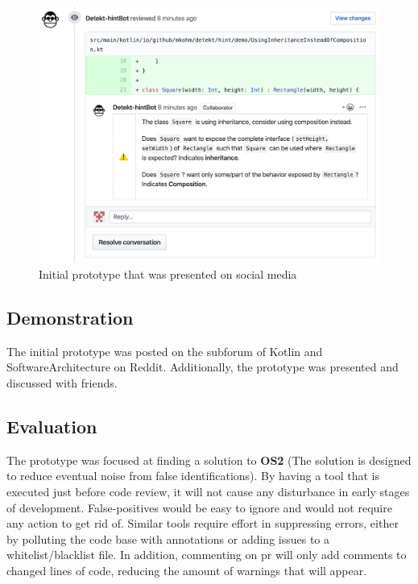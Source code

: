\documentclass{report}
\begin{document}
\begin{figure}[h!]
    \centering
    \includegraphics[width=\textwidth]{../images/demo.png}
    \caption{Initial prototype that was presented on social media}
    \label{fig:mockup}
\end{figure}

\subsection*{Demonstration}
The initial prototype was posted on the subforum of Kotlin\cite{kotlin-reddit} and SoftwareArchitecture\cite{softwarearch-reddit} on Reddit. Additionally, the prototype was presented and discussed with friends. 

\subsection*{Evaluation}
The prototype was focused at finding a solution to \textbf{OS2} (The solution is designed to reduce eventual noise from false identifications). By having a tool that is executed just before code review, it will not cause any disturbance in early stages of development. False-positives would be easy to ignore and would not require any action to get rid of. Similar tools require effort in suppressing errors, either by polluting the code base with annotations or adding issues to a whitelist/blacklist file. In addition, commenting on \gls{pr} will only add comments to changed lines of code, reducing the amount of warnings that will appear.  
\end{document}
